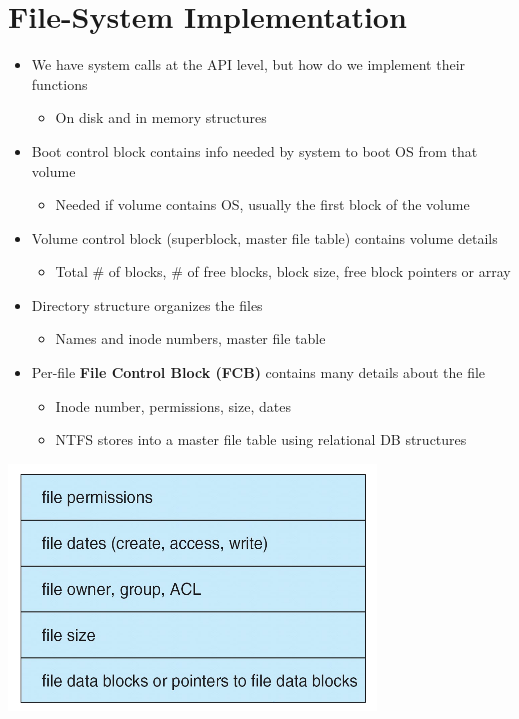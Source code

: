 \documentclass{article}[18pt]
\begin{document}
\section{File-System Implementation}
\begin{itemize}
	\item We have system calls at the API level, but how do we implement their functions
	\begin{itemize}
		\item On disk and in memory structures
	\end{itemize}
	\item Boot control block contains info needed by system to boot OS from that volume
	\begin{itemize}
		\item Needed if volume contains OS, usually the first block of the volume
	\end{itemize}
	\item Volume control block (superblock, master file table) contains volume details
	\begin{itemize}
		\item Total \# of blocks, \# of free blocks, block size, free block pointers or array
	\end{itemize}
	\item Directory structure organizes the files
	\begin{itemize}
		\item Names and inode numbers, master file table
	\end{itemize}
	\item Per-file \textbf{File Control Block (FCB)} contains many details about the file
	\begin{itemize}
		\item Inode number, permissions, size, dates
		\item NTFS stores into a master file table using relational DB structures
	\end{itemize}
\end{itemize}
\begin{center}
	\includegraphics[scale=0.7]{Implementation}
\end{center}
\end{document}

